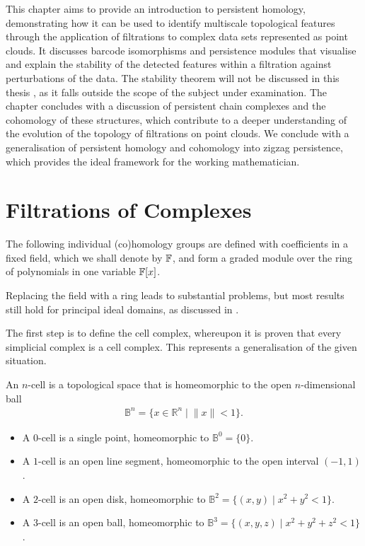 \label{PersistentHomology}
This chapter aims to provide an introduction to persistent homology, demonstrating how it can be used to identify multiscale topological features through the application of filtrations to complex data sets represented as point clouds. It discusses barcode isomorphisms and persistence modules that visualise and explain the stability of the detected features within a filtration against perturbations of the data. 
The stability theorem will not be discussed in this thesis \cite{chazal2016structure}, as it falls outside the scope of the subject under examination. The chapter concludes with a discussion of persistent chain complexes and the cohomology of these structures, which contribute to a deeper understanding of the evolution of the topology of filtrations on point clouds. We conclude with a generalisation of persistent homology and cohomology into zigzag persistence, which provides the ideal framework for the working mathematician.

\section{Filtrations of Complexes}
\label{FiltrationsofComplexes}
The following individual (co)homology groups are defined with coefficients in a fixed field, which we shall denote by ${\mathbb{F}}$, and form a graded module over the ring of polynomials in one variable ${\mathbb{F}}[x]$.

Replacing the field with a ring leads to substantial problems, but most results still hold for principal ideal domains, as discussed in \cite[\S 3.1]{zomorodian2004computing}.

The first step is to define the cell complex, whereupon it is proven that every simplicial complex is a cell complex. This represents a generalisation of the given situation.

\begin{definition}[\(n\)-cell]
An \(n\)-cell is a topological space that is homeomorphic to the open \(n\)-dimensional ball
\begin{align}
\mathbb{B}^n = \{ x \in \mathbb{R}^n \; \vert \; \|x\| < 1 \}.
\end{align}
\end{definition}

\begin{example}\noindent
\begin{itemize}
    \item A $0$-cell is a single point, homeomorphic to \(\mathbb{B}^0 = \{ 0 \}\).
    \item A $1$-cell is an open line segment, homeomorphic to the open interval \((-1, 1)\).
    \item A $2$-cell is an open disk, homeomorphic to \(\mathbb{B}^2 = \{ (x, y) \; \vert \; x^2 + y^2 < 1 \}\).
    \item A $3$-cell is an open ball, homeomorphic to \(\mathbb{B}^3 = \{ (x, y, z) \; \vert \; x^2 + y^2 + z^2 < 1 \}\).
\end{itemize}
\end{example}

